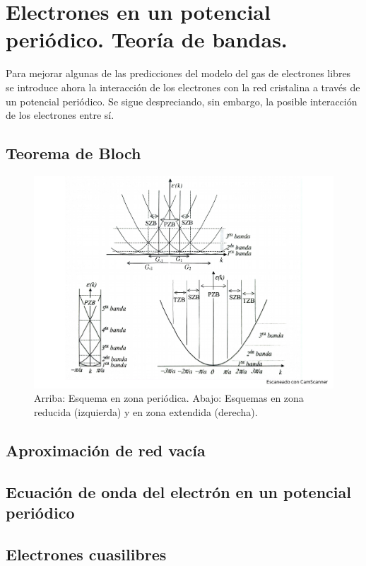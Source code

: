 \chapter{Electrones en un potencial periódico. Teoría de bandas.} \label{Ch:07}

Para mejorar algunas de las predicciones del modelo del gas de electrones libres se introduce ahora la interacción de los electrones con la red cristalina a través de un potencial periódico. Se sigue despreciando, sin embargo, la posible interacción de los electrones entre sí.

\section{Teorema de Bloch}

\begin{figure}[h!] \centering
    \includegraphics[scale=0.5]{Cuerpo/Ch_07/Fotos libro 1.pdf}
    \caption{Arriba: Esquema en zona periódica. Abajo: Esquemas en zona reducida (izquierda) y en zona extendida (derecha).}
    \label{Fig:07-01}
\end{figure}    


\section{Aproximación de red vacía}

\section{Ecuación de onda del electrón en un potencial periódico}

\section{Electrones cuasilibres}

